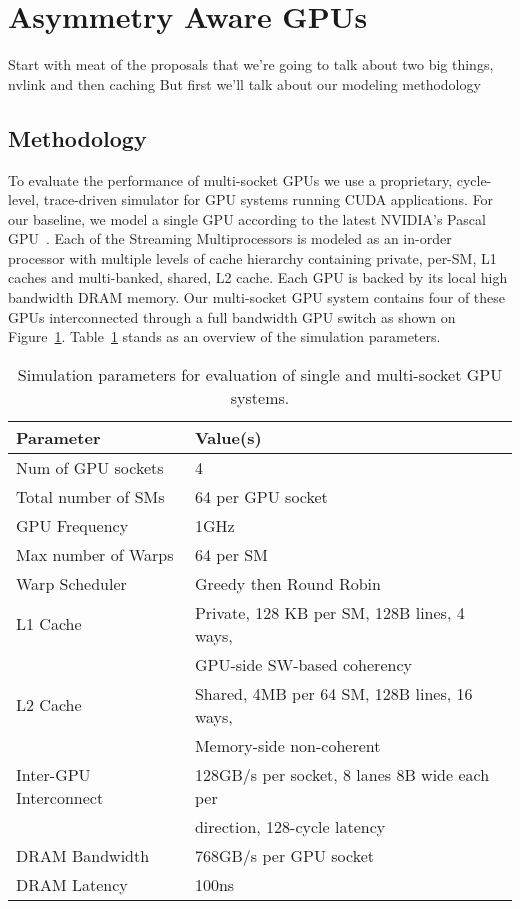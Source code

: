 \section{Asymmetry Aware GPUs}

Start with meat of the proposals that we're going to talk about two big things, nvlink and then caching
But first we'll talk about our modeling methodology


\subsection{Methodology}
\label{methodology}


To evaluate the performance of multi-socket GPUs we use a proprietary, cycle-level, trace-driven simulator for GPU systems running CUDA applications. For our baseline, we model a single GPU according to the latest NVIDIA's Pascal GPU~\cite{inside-pascal}. Each of the Streaming Multiprocessors is modeled as an in-order processor with multiple levels of cache hierarchy containing private, per-SM, L1 caches and multi-banked, shared, L2 cache. Each GPU is backed by its local high bandwidth DRAM memory. Our multi-socket GPU system contains four of these GPUs interconnected through a full bandwidth GPU switch as shown on Figure~\ref{}. Table~\ref{tab:setup} stands as an overview of the simulation parameters.

\begin{table}[h]
\begin{small}
\centering
\begin{tabular}{ll}
\toprule
\textbf{Parameter} & \textbf{Value(s)} \\
\toprule
Num of GPU sockets & 4 \\
\midrule
Total number of SMs & 64 per GPU socket \\
\midrule
GPU Frequency & 1GHz \\
\midrule
Max number of Warps & 64 per SM \\
\midrule
Warp Scheduler & Greedy then Round Robin \\
\midrule
L1 Cache & Private, 128 KB per SM, 128B lines, 4 ways, \\ & GPU-side SW-based coherency \\
\midrule
L2 Cache & Shared, 4MB per 64 SM, 128B lines, 16 ways, \\ & Memory-side non-coherent\\
\midrule
Inter-GPU Interconnect & 128GB/s per socket, 8 lanes 8B wide each per \\ & direction, 128-cycle latency \\
\midrule
DRAM Bandwidth & 768GB/s per GPU socket\\
\midrule
DRAM Latency & 100ns \\
\toprule
\end{tabular}
\caption{Simulation parameters for evaluation of single and multi-socket GPU systems.}
\label{tab:setup}
\end{small}
\end{table}

